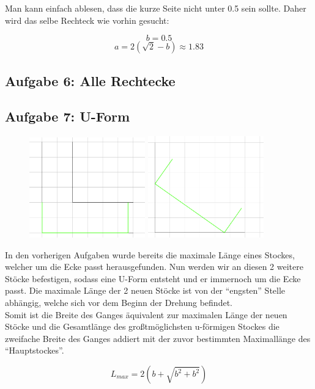 \documentclass[a4paper,11pt]{article}
\begin{document}
Man kann einfach ablesen, dass die kurze Seite nicht unter 0.5 sein sollte. Daher wird das selbe Rechteck wie vorhin gesucht:

\[ b = 0.5 \]
\[ a = 2(\sqrt{2}-b) \approx 1.83 \]

\subsection{Aufgabe 6: Alle Rechtecke}

\subsection{Aufgabe 7: U-Form}
\begin{figure}[H] 
        \centering
        \includegraphics[width=5cm]{img/A7_1.png}
        \includegraphics[width=5cm]{img/A7_2.png}
\end{figure}
In den vorherigen Aufgaben wurde bereits die maximale Länge eines Stockes, welcher um die Ecke passt herausgefunden. Nun werden wir an diesen 2 weitere Stöcke befestigen, sodass eine U-Form entsteht und er immernoch um die Ecke passt. Die maximale Länge der 2 neuen Stöcke ist von der “engsten” Stelle abhängig, welche sich vor dem Beginn der Drehung befindet.\\

Somit ist die Breite des Ganges äquivalent zur maximalen Länge der neuen Stöcke und die Gesamtlänge des großtmöglichsten u-förmigen Stockes die zweifache Breite des Ganges addiert mit der zuvor bestimmten Maximallänge des “Hauptstockes”.

\[ L_{max} = 2(b+\sqrt{b^2+b^2}) \]
\end{document}
